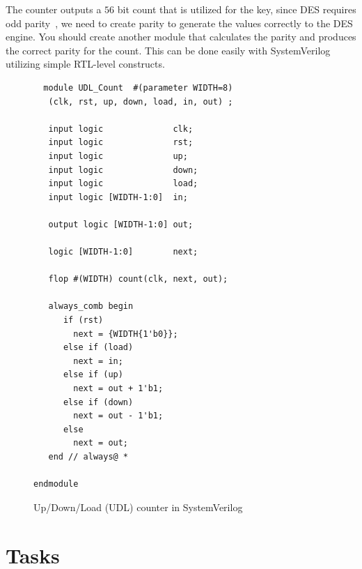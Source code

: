 \documentclass{article}
\begin{document}
The counter outputs a $56$ bit count that is utilized for the key,
since DES requires odd parity~\cite{fips463}, we need to create parity to generate
the values correctly to the DES engine.  You should create another
module that calculates the parity and produces the correct parity for
the count.  This can be done easily with SystemVerilog utilizing
simple RTL-level constructs.
\begin{figure}
  \centering
  {\footnotesize
\begin{verbatim}
  module UDL_Count  #(parameter WIDTH=8) 
   (clk, rst, up, down, load, in, out) ;

   input logic              clk;
   input logic              rst;
   input logic              up;
   input logic              down;
   input logic              load;
   input logic [WIDTH-1:0]  in;
   
   output logic [WIDTH-1:0] out;

   logic [WIDTH-1:0]        next;
   
   flop #(WIDTH) count(clk, next, out);

   always_comb begin
      if (rst)
        next = {WIDTH{1'b0}};
      else if (load)
        next = in;
      else if (up)
        next = out + 1'b1;
      else if (down)
        next = out - 1'b1;
      else
        next = out;
   end // always@ *
   
endmodule 
\end{verbatim}
}
\caption{Up/Down/Load (UDL) counter in SystemVerilog}
\label{count.fig}
\end{figure}


\section{Tasks}
\end{document}
